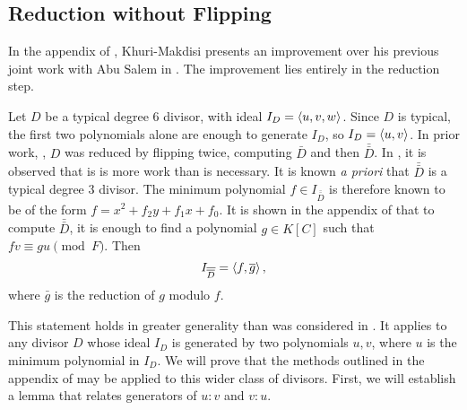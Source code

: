 
\subsection{Reduction without Flipping}
\label{sec_reduction}

In the appendix of \cite{kmakdisi18}, Khuri-Makdisi presents an improvement
over his previous joint work with Abu Salem in \cite{salem07}.
The improvement lies entirely in the reduction step.

Let $D$ be a typical degree 6 divisor, with ideal $I_D = \left\langle u,v,w \right\rangle$.
Since $D$ is typical, the first two polynomials alone are enough to generate $I_D$,
so $I_D = \left\langle u,v \right\rangle$.
In prior work, \cite{salem07}, $D$ was reduced by flipping twice, computing $\bar D$ and then $\bar{\bar D}$.
In \cite{kmakdisi18}, it is observed that is is more work than is necessary.
It is known \emph{a priori} that $\bar{\bar D}$ is a typical degree 3 divisor.
The minimum polynomial $f \in I_{\bar{\bar D}}$ is therefore known to be of the form $f = x^2 + f_2y + f_1x + f_0$.
It is shown in the appendix of \cite{kmakdisi18} that to compute $\bar{\bar D}$,
it is enough to find a polynomial $g \in K[C]$ such that $fv \equiv gu \pmod F$.
Then
  \[ I_{\overline{\overline D}} = \left\langle f, \overline g \right\rangle, \]
where $\bar g$ is the reduction of $g$ modulo $f$.

This statement holds in greater generality than was considered in \cite{kmakdisi18}.
It applies to any divisor $D$ whose ideal $I_D$ is generated by two polynomials $u,v$,
where $u$ is the minimum polynomial in $I_D$.
We will prove that the methods outlined in the appendix of \cite{kmakdisi18}
may be applied to this wider class of divisors.
First, we will establish a lemma that relates generators of $u : v$ and $v : u$.

